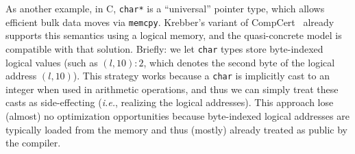 As another example, in C, \texttt{char*} is a ``universal'' pointer type, which allows
efficient bulk data moves via \texttt{memcpy}.  Krebber's variant of
CompCert~\cite{krebbers2014formal} already supports this semantics using a logical
memory, and the quasi-concrete model is compatible with that solution.
Briefly: we let \texttt{char} types store byte-indexed logical values
(such as $(l,10)\!:\!2$, which denotes the second byte of the logical
address $(l,10)$). This strategy works because a \texttt{char} is
implicitly cast to an integer when used in arithmetic operations,
and thus we
can simply treat these casts as side-effecting (\textit{i.e.},
realizing the logical addresses).  This approach lose (almost) no
optimization opportunities because byte-indexed logical addresses
are typically loaded from the memory and 
thus (mostly) already treated as public by the compiler.









